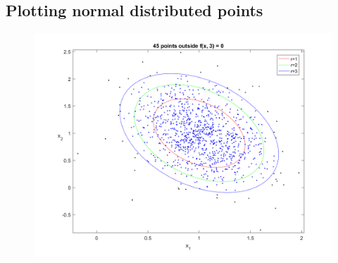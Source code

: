 \documentclass[a4paper,11pt]{article}
\begin{document}
\subsection{Plotting normal distributed points}
\begin{figure}[h]
  \begin{center}
    \includegraphics[width=\textwidth]{P2_1}
    \caption{}
    \label{fig:P2_1}
  \end{center}
\end{figure}
\clearpage
\end{document}
